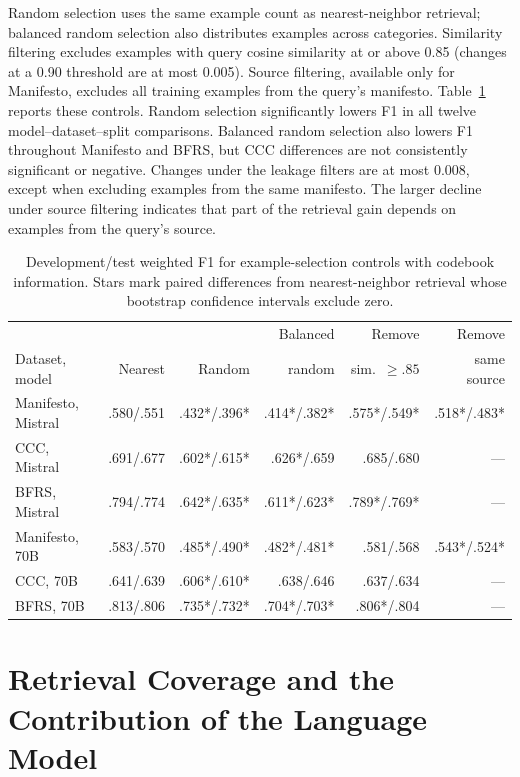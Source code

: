\documentclass[11pt]{article}
\begin{document}
Random selection uses the same example count as nearest-neighbor retrieval; balanced random selection also distributes examples across categories. Similarity filtering excludes examples with query cosine similarity at or above 0.85 (changes at a 0.90 threshold are at most 0.005). Source filtering, available only for Manifesto, excludes all training examples from the query's manifesto. Table~\ref{tab:selection-controls} reports these controls. Random selection significantly lowers F1 in all twelve model--dataset--split comparisons. Balanced random selection also lowers F1 throughout Manifesto and BFRS, but CCC differences are not consistently significant or negative. Changes under the leakage filters are at most 0.008, except when excluding examples from the same manifesto. The larger decline under source filtering indicates that part of the retrieval gain depends on examples from the query's source.

\begin{table}[!t]
\centering
\begin{tabular}{lrrrrr}
\toprule
 & & & Balanced & Remove & Remove \\
Dataset, model & Nearest & Random & random & sim.\ $\geq .85$ & same source \\
\midrule
Manifesto, Mistral & .580/.551 & .432*/.396* & .414*/.382* & .575*/.549* & .518*/.483* \\
CCC, Mistral & .691/.677 & .602*/.615* & .626*/.659 & .685/.680 & --- \\
BFRS, Mistral & .794/.774 & .642*/.635* & .611*/.623* & .789*/.769* & --- \\
Manifesto, 70B & .583/.570 & .485*/.490* & .482*/.481* & .581/.568 & .543*/.524* \\
CCC, 70B & .641/.639 & .606*/.610* & .638/.646 & .637/.634 & --- \\
BFRS, 70B & .813/.806 & .735*/.732* & .704*/.703* & .806*/.804 & --- \\
\bottomrule
\end{tabular}
\caption{Development/test weighted F1 for example-selection controls with codebook information. Stars mark paired differences from nearest-neighbor retrieval whose bootstrap confidence intervals exclude zero.}
\label{tab:selection-controls}
\end{table}


\section{Retrieval Coverage and the Contribution of the Language Model}
\label{app:retrieval-diagnostics}
\end{document}
